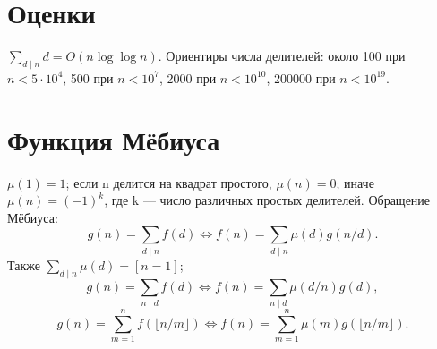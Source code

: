 \section{Оценки}
$\sum_{d\mid n}d=O(n\log\log n)$.
Ориентиры числа делителей: около 100 при $n<5\cdot10^4$,
500 при $n<10^7$, 2000 при $n<10^{10}$, 200000 при $n<10^{19}$.
\section{Функция Мёбиуса}
$\mu(1)=1$; если n делится на квадрат простого, $\mu(n)=0$;
иначе $\mu(n)=(-1)^k$, где k — число различных простых делителей.
Обращение Мёбиуса:
\[g(n)=\sum_{d\mid n}f(d)\iff f(n)=\sum_{d\mid n}\mu(d)g(n/d).\]
Также $\sum_{d\mid n}\mu(d)=[n=1]$;
\[g(n)=\sum_{n\mid d}f(d)\iff f(n)=\sum_{n\mid d}\mu(d/n)g(d),\]
\[g(n)=\sum_{m=1}^nf(\lfloor n/m\rfloor)
\iff f(n)=\sum_{m=1}^n\mu(m)g(\lfloor n/m\rfloor).\]
